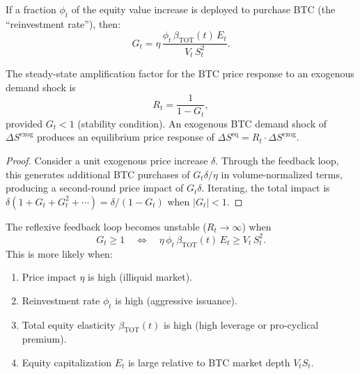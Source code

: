 If a fraction $\phi_t$ of the equity value increase is deployed
to purchase BTC (the ``reinvestment rate''), then:
\begin{equation}
  G_t = \eta\,\frac{\phi_t\,\beta_{\mathrm{TOT}}(t)\,E_t}{V_t\,S_t^2}.
  \label{eq:gain_explicit}
\end{equation}

\begin{proposition}
\label{prop:reflexivity}
The steady-state amplification factor for the BTC price response
to an exogenous demand shock is
\begin{equation}
  R_t = \frac{1}{1 - G_t},
  \label{eq:amplification}
\end{equation}
provided $G_t < 1$ (stability condition).
An exogenous BTC demand shock of $\Delta S^{\mathrm{exog}}$
produces an equilibrium price response of
$\Delta S^{\mathrm{eq}} = R_t \cdot \Delta S^{\mathrm{exog}}$.
\end{proposition}

\begin{proof}
Consider a unit exogenous price increase $\delta$.
Through the feedback loop, this generates additional BTC purchases
of $G_t \delta / \eta$ in volume-normalized terms, producing a
second-round price impact of $G_t \delta$.
Iterating, the total impact is
$\delta(1 + G_t + G_t^2 + \cdots) = \delta/(1 - G_t)$
when $|G_t| < 1$.
\end{proof}

\begin{proposition}
\label{prop:instability}
The reflexive feedback loop becomes unstable ($R_t \to \infty$) when
\begin{equation}
  G_t \ge 1
  \quad\Longleftrightarrow\quad
  \eta\,\phi_t\,\beta_{\mathrm{TOT}}(t)\,E_t \ge V_t\,S_t^2.
  \label{eq:instability}
\end{equation}
This is more likely when:
\begin{enumerate}
  \item Price impact $\eta$ is high (illiquid market).
  \item Reinvestment rate $\phi_t$ is high (aggressive issuance).
  \item Total equity elasticity $\beta_{\mathrm{TOT}}(t)$ is high
    (high leverage or pro-cyclical premium).
  \item Equity capitalization $E_t$ is large relative to BTC market
    depth $V_t S_t$.
\end{enumerate}
\end{proposition}

